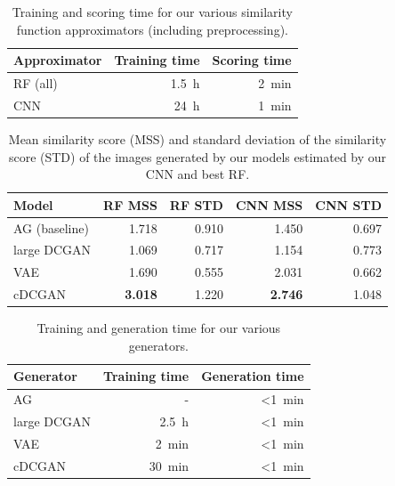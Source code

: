 \documentclass[10pt,conference,compsocconf]{IEEEtran}
\begin{document}
\begin{table}\centering
    \begin{tabular}{lrr}
    \toprule
        Approximator    & Training time     & Scoring time \\
    \midrule
        RF (all)        & \SI{1.5}{\hour}   & \SI{2}{\minute} \\
        CNN             & \SI{24}{\hour}    & \SI{1}{\minute}  \\
    \bottomrule
    \end{tabular}
\caption{Training and scoring time for our various similarity function approximators (including preprocessing).}\label{tab:SFA_time}
\end{table}

\begin{table}\centering
    \begin{tabular}{lrr|rr}
    \toprule
        Model           & RF MSS                & RF STD        & CNN MSS               & CNN STD \\
    \midrule
        AG (baseline)   & \SI{1.718}{}          & \SI{0.910}{}  & \SI{1.450}{}          & \SI{0.697}{} \\
        large DCGAN     & \SI{1.069}{}          & \SI{0.717}{}  & \SI{1.154}{}          & \SI{0.773}{} \\
        VAE             & \SI{1.690}{}          & \SI{0.555}{}  & \SI{2.031}{}          & \SI{0.662}{} \\
        cDCGAN          & \textbf{\SI{3.018}{}} & \SI{1.220}{}  & \textbf{\SI{2.746}{}} & \SI{1.048}{} \\
    \bottomrule
    \end{tabular}
\caption{Mean similarity score (MSS) and standard deviation of the similarity score (STD) of the images generated by our models estimated by our CNN and best RF.}\label{tab:gen_MSS}
\end{table}

\begin{table}\centering
    \begin{tabular}{lrr}
    \toprule
        Generator   & Training time     & Generation time \\
    \midrule
        AG          & -                 & \SI{<1}{\minute} \\
        large DCGAN & \SI{2.5}{\hour}   & \SI{<1}{\minute} \\
        VAE         & \SI{2}{\minute}   & \SI{<1}{\minute} \\
        cDCGAN      & \SI{30}{\minute}  & \SI{<1}{\minute} \\
    \bottomrule
    \end{tabular}
\caption{Training and generation time for our various generators.}
\label{tab:gen_time}
\end{table}
\end{document}
